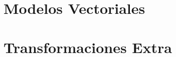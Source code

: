 \documentclass{beamer}
\begin{document}


\section{Modelos Vectoriales}
\section{Transformaciones Extra}
\end{document}
